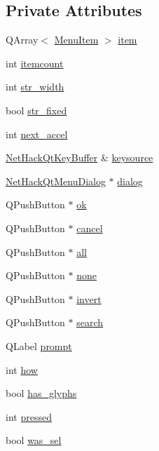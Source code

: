\subsection*{Private Attributes}
\begin{DoxyCompactItemize}
\item 
Q\+Array$<$ \hyperlink{structNetHackQtMenuWindow_1_1MenuItem}{Menu\+Item} $>$ \hyperlink{classNetHackQtMenuWindow_aaec42ac6f632112d34336815c8933075}{item}
\item 
int \hyperlink{classNetHackQtMenuWindow_a4a7d2fdb16df84bff23d2e3297dd9d75}{itemcount}
\item 
int \hyperlink{classNetHackQtMenuWindow_a164d38bebb6790a6dec8600c23eaf2b9}{str\+\_\+width}
\item 
bool \hyperlink{classNetHackQtMenuWindow_a94a155d3ec5b1f2b1c96a9bb623abeb3}{str\+\_\+fixed}
\item 
int \hyperlink{classNetHackQtMenuWindow_acc7a7cab6a95bbc47afa4f399d2de3c4}{next\+\_\+accel}
\item 
\hyperlink{classNetHackQtKeyBuffer}{Net\+Hack\+Qt\+Key\+Buffer} \& \hyperlink{classNetHackQtMenuWindow_a27e5b7a2172269810de78035bb0d7cc3}{keysource}
\item 
\hyperlink{classNetHackQtMenuDialog}{Net\+Hack\+Qt\+Menu\+Dialog} $\ast$ \hyperlink{classNetHackQtMenuWindow_af1c015a42d63ee6a4a90e2f4e4d85445}{dialog}
\item 
Q\+Push\+Button $\ast$ \hyperlink{classNetHackQtMenuWindow_aa2e9444fc612a7bb79284013805721f1}{ok}
\item 
Q\+Push\+Button $\ast$ \hyperlink{classNetHackQtMenuWindow_ad3518cf90fdcf236975aca221b9e4ca8}{cancel}
\item 
Q\+Push\+Button $\ast$ \hyperlink{classNetHackQtMenuWindow_af48bf7d0f35f0d2e0b918b259019b81d}{all}
\item 
Q\+Push\+Button $\ast$ \hyperlink{classNetHackQtMenuWindow_a6515089e347ad7a37a5ad916aa2d5e33}{none}
\item 
Q\+Push\+Button $\ast$ \hyperlink{classNetHackQtMenuWindow_aa1a2aa9149fcc0bb90814afe5fb1eefe}{invert}
\item 
Q\+Push\+Button $\ast$ \hyperlink{classNetHackQtMenuWindow_a81cb1543e789b743616b995777685046}{search}
\item 
Q\+Label \hyperlink{classNetHackQtMenuWindow_a469aff3117dff7ccd1e985caefbe1378}{prompt}
\item 
int \hyperlink{classNetHackQtMenuWindow_aeedf5ff2753872ccbcaf8680f0b6071b}{how}
\item 
bool \hyperlink{classNetHackQtMenuWindow_a01594b232770368bda4a390f85b0eb93}{has\+\_\+glyphs}
\item 
int \hyperlink{classNetHackQtMenuWindow_a0cc94488ff2afe379727c57bcc3752e6}{pressed}
\item 
bool \hyperlink{classNetHackQtMenuWindow_a7aeae1d296f7391cec0d59417b7acf66}{was\+\_\+sel}
\end{DoxyCompactItemize}
